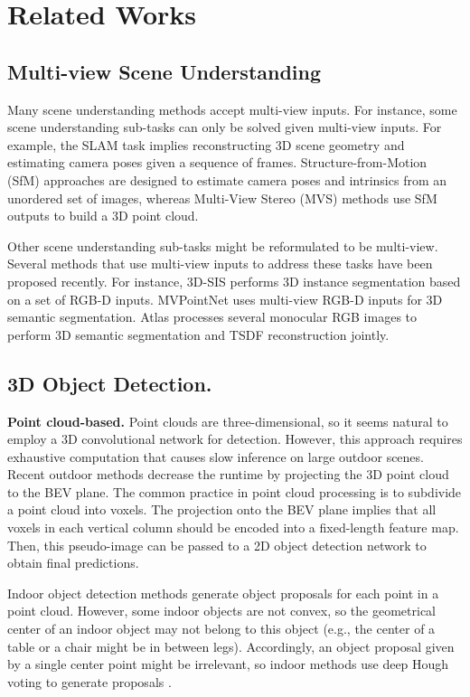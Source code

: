 \documentclass[10pt,twocolumn,letterpaper]{article}
\begin{document}
\section{Related Works}

\subsection{Multi-view Scene Understanding}

Many scene understanding methods accept multi-view inputs. For instance, some scene understanding sub-tasks can only be solved given multi-view inputs. For example, the SLAM task implies reconstructing 3D scene geometry and estimating camera poses given a sequence of frames. Structure-from-Motion (SfM) approaches are designed to estimate camera poses and intrinsics from an unordered set of images, whereas Multi-View Stereo (MVS) methods use SfM outputs to build a 3D point cloud.

Other scene understanding sub-tasks might be reformulated to be multi-view. Several methods that use multi-view inputs to address these tasks have been proposed recently. For instance, 3D-SIS \cite{hou20193dsis} performs 3D instance segmentation based on a set of RGB-D inputs. MVPointNet \cite{jaritz2019mvpointnet} uses multi-view RGB-D inputs for 3D semantic segmentation. Atlas \cite{murez2020atlas} processes several monocular RGB images to perform 3D semantic segmentation and TSDF reconstruction jointly. 

\subsection{3D Object Detection.}

\textbf{Point cloud-based.} Point clouds are three-dimensional, so it seems natural to employ a 3D convolutional network for detection. However, this approach requires exhaustive computation that causes slow inference on large outdoor scenes. Recent outdoor methods \cite{yan2018second, lang2019pointpillars} decrease the runtime by projecting the 3D point cloud to the BEV plane. The common practice in point cloud processing is to subdivide a point cloud into voxels. The projection onto the BEV plane implies that all voxels in each vertical column should be encoded into a fixed-length feature map. Then, this pseudo-image can be passed to a 2D object detection network to obtain final predictions.

Indoor object detection methods generate object proposals for each point in a point cloud. However, some indoor objects are not convex, so the geometrical center of an indoor object may not belong to this object (e.g., the center of a table or a chair might be in between legs). Accordingly, an object proposal given by a single center point might be irrelevant, so indoor methods use deep Hough voting to generate proposals \cite{qi2019votenet, qi2020imvotenet, zhang2020h3dnet}. 
\end{document}
